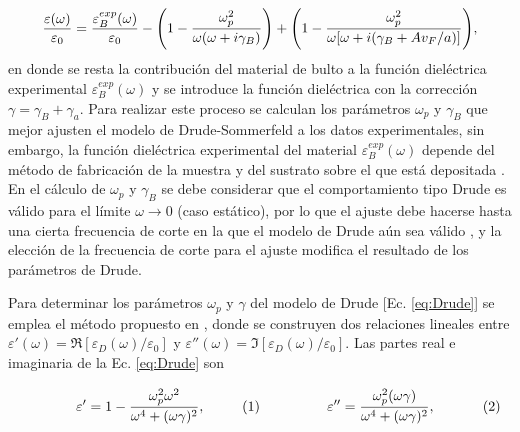 %
	\begin{align}
	\frac{\varepsilon(\omega)}{\varepsilon_0} = \frac{\varepsilon_B^{exp}(\omega)}{\varepsilon_0}
						 - \qty( 1 - \frac{\omega_p^2}{\omega(\omega+i\gamma_B)}) 
						 + \qty( 1 - \frac{\omega_p^2}{\omega[\omega+i(\gamma_B + Av_F/a)]}),
			\label{eq:sizeCorrection}
	\end{align}
%
en donde se resta la contribución del material de bulto  a la función dieléctrica experimental $ \varepsilon_B^{exp}(\omega)$ y se introduce la función dieléctrica con la corrección $\gamma = \gamma_B+\gamma_a$. Para realizar este proceso se calculan los parámetros $\omega_p$ y $\gamma_B$ que mejor ajusten el modelo de Drude-Sommerfeld a los datos experimentales, sin embargo, la función dieléctrica experimental del material $\varepsilon_B^{exp}(\omega)$ depende del método de fabricación de la muestra y del sustrato sobre el que está depositada \cite{svetovoy2008optical,raja2019dielectric}. En el cálculo de $\omega_p$ y $\gamma_B$ se debe considerar que el comportamiento tipo Drude es válido para el límite $\omega\to 0$ (caso estático), por lo que el ajuste debe hacerse hasta una cierta frecuencia de corte en la que el modelo de Drude aún sea válido \cite{mendoza2014determination}, y la elección de la frecuencia de corte para el ajuste modifica el resultado de los parámetros de Drude.

Para determinar los parámetros $\omega_p$ y $\gamma$ del modelo de Drude [Ec. \eqref{eq:Drude}] se emplea el método propuesto en \cite{mendoza2014determination}, donde se construyen dos relaciones lineales entre $\varepsilon'(\omega) = \Re[\varepsilon_D(\omega)/\varepsilon_0]$ y $\varepsilon''(\omega)=\Im[\varepsilon_D(\omega)/\varepsilon_0]$. Las partes real e imaginaria de la Ec. \eqref{eq:Drude} son%

	\begin{subequations}\eqhalf{\varepsilon' =
		 1 - \frac{\omega_p^2 \omega^2}{\omega^4 + (\omega\gamma)^2},
		 \label{eqs:ReDrude}}
	\eqhalf{\varepsilon'' =
		 \frac{\omega_p^2  (\omega\gamma)}{\omega^4 + (\omega\gamma)^2},
		 \label{eqs:ImDrude}
			}\end{subequations} 
			
